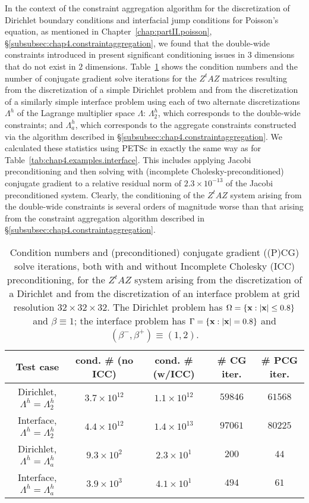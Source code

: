 In the context of the constraint aggregation algorithm for the discretization of Dirichlet boundary conditions and interfacial jump conditions for Poisson's equation, as mentioned in Chapter~\ref{chap:partII.poisson}, \S\ref{subsubsec:chap4.constraintaggregation}, we found that the double-wide constraints introduced in \cite{Bedrossian10} present significant conditioning issues in $3$ dimensions that do not exist in $2$ dimensions. Table~\ref{tab:partII.constraintconditioning} shows the condition numbers and the number of conjugate gradient solve iterations for the $Z^tAZ$ matrices resulting from the discretization of a simple Dirichlet problem and from the discretization of a similarly simple interface problem using each of two alternate discretizations $\Lambda^h$ of the Lagrange multiplier space $\Lambda$: $\Lambda^h_2$, which corresponds to the double-wide constraints; and $\Lambda^h_a$, which corresponds to the aggregate constraints constructed via the algorithm described in \S\ref{subsubsec:chap4.constraintaggregation}. We calculated these statistics using PETSc in exactly the same way as for Table~\ref{tab:chap4.examples.interface}. This includes applying Jacobi preconditioning and then solving with (incomplete Cholesky-preconditioned) conjugate gradient to a relative residual norm of $2.3 \times 10^{-13}$ of the Jacobi preconditioned system. Clearly, the conditioning of the $Z^tAZ$ system arising from the double-wide constraints is several orders of magnitude worse than that arising from the constraint aggregation algorithm described in \S\ref{subsubsec:chap4.constraintaggregation}.

\begin{table}[htbp]
\centering
\begin{tabular}{|c|c|c|c|c|}
\hline
Test case & cond. \# (no ICC) & cond. \# (w/ICC) & \# CG iter. & \# PCG iter. \\
\hline
Dirichlet, $\Lambda^h = \Lambda^h_2$ & $3.7 \times 10^{12}$ & $1.1 \times 10^{12}$ & $59846$ & $61568$ \\
Interface, $\Lambda^h = \Lambda^h_2$ & $4.4 \times 10^{12}$ & $1.4 \times 10^{13}$ & $97061$ & $80225$ \\
Dirichlet, $\Lambda^h = \Lambda^h_a$ & $9.3 \times 10^{ 2}$ & $2.3 \times 10^{ 1}$ &   $200$ &    $44$ \\
Interface, $\Lambda^h = \Lambda^h_a$ & $3.9 \times 10^{ 3}$ & $4.1 \times 10^{ 1}$ &   $494$ &    $61$ \\
\hline
\end{tabular}
\caption{Condition numbers and (preconditioned) conjugate gradient ((P)CG) solve iterations, both with and without Incomplete Cholesky (ICC) preconditioning, for the $Z^tAZ$ system arising from the discretization of a Dirichlet and from the discretization of an interface problem at grid resolution $32 \times 32 \times 32$. The Dirichlet problem has $\Omega = \{\mathbf{x} : \left\lvert \mathbf{x} \right\rvert \leq 0.8\}$ and $\beta \equiv 1$; the interface problem has $\Gamma = \{\mathbf{x} : \left\lvert \mathbf{x} \right\rvert = 0.8\}$ and $(\beta^-, \beta^+) \equiv (1, 2)$.}
\label{tab:partII.constraintconditioning}
\end{table}
